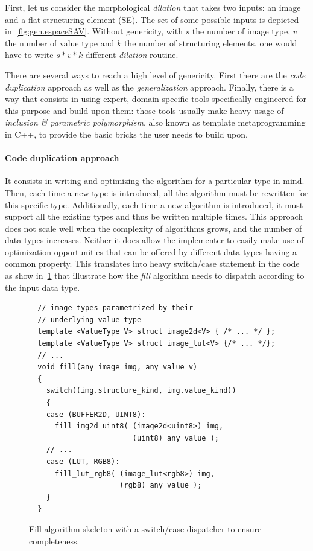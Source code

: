 First, let us consider the morphological \emph{dilation} that takes two inputs: an image and a flat structuring element
(SE). The set of some possible inputs is depicted in~\ref{fig:gen.espaceSAV}. Without genericity, with \(s\) the number
of image type, \(v\) the number of value type and \(k\) the number of structuring elements, one would have to write \(s
* v * k\) different \emph{dilation} routine.

There are several ways to reach a high level of genericity. First there are the \emph{code duplication} approach as well
as the \emph{generalization} approach. Finally, there is a way that consists in using expert, domain specific tools
specifically engineered for this purpose and build upon them: those tools usually make heavy usage of \emph{inclusion
  \& parametric polymorphism}, also known as template metaprogramming in C++, to provide the basic bricks the user needs
to build upon.

\paragraph{Code duplication approach} It consists in writing and optimizing the algorithm for a particular type in mind.
Then, each time a new type is introduced, all the algorithm must be rewritten for this specific type. Additionally, each
time a new algorithm is introduced, it must support all the existing types and thus be written multiple times. This
approach does not scale well when the complexity of algorithms grows, and the number of data types increases. Neither it
does allow the implementer to easily make use of optimization opportunities that can be offered by different data types
having a common property. This translates into heavy switch/case statement in the code as show in~\ref{code:gen.exhau}
that illustrate how the \emph{fill} algorithm needs to dispatch according to the input data type.

\begin{figure}[htbp]
  \centering
  \begin{verbatim}
  // image types parametrized by their
  // underlying value type
  template <ValueType V> struct image2d<V> { /* ... */ };
  template <ValueType V> struct image_lut<V> {/* ... */};
  // ...
  void fill(any_image img, any_value v)
  {
    switch((img.structure_kind, img.value_kind))
    {
    case (BUFFER2D, UINT8):
      fill_img2d_uint8( (image2d<uint8>) img,
                        (uint8) any_value );
    // ...
    case (LUT, RGB8):
      fill_lut_rgb8( (image_lut<rgb8>) img,
                     (rgb8) any_value );
    }
  }
  \end{verbatim}
  \caption{Fill algorithm skeleton with a switch/case dispatcher to ensure completeness.}
  \label{code:gen.exhau}
\end{figure}

